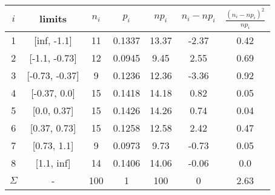\begin{tabular}{| c | c | c | c | c | c | c |} \hline
$i$ & limits & $n_i$ & $p_i$ & $np_i$ & $n_i - np_i$ & $\frac{(n_i-np_i)^2}{np_i} $ \\ \hline 
1 & [inf, -1.1] & 11 & 0.1337 & 13.37 & -2.37 & 0.42 \\ \hline 
2 & [-1.1, -0.73] & 12 & 0.0945 & 9.45 & 2.55 & 0.69 \\ \hline 
3 & [-0.73, -0.37] & 9 & 0.1236 & 12.36 & -3.36 & 0.92 \\ \hline 
4 & [-0.37, 0.0] & 15 & 0.1418 & 14.18 & 0.82 & 0.05 \\ \hline 
5 & [0.0, 0.37] & 15 & 0.1426 & 14.26 & 0.74 & 0.04 \\ \hline 
6 & [0.37, 0.73] & 15 & 0.1258 & 12.58 & 2.42 & 0.47 \\ \hline 
7 & [0.73, 1.1] & 9 & 0.0973 & 9.73 & -0.73 & 0.05 \\ \hline 
8 & [1.1, inf] & 14 & 0.1406 & 14.06 & -0.06 & 0.0 \\ \hline 
$\Sigma$ & - & 100 & 1 & 100 & 0 & 2.63 \\ \hline 
\end{tabular}